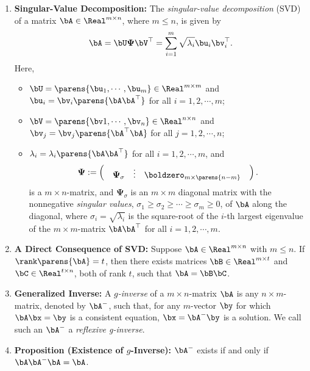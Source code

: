 \documentclass[12pt]{article}
\begin{document}
\begin{enumerate}[label=\textbf{\arabic*.}]
	\item \textbf{Singular-Value Decomposition:} The \textit{singular-value decomposition} (SVD) of a matrix $\bA \in \Real^{m \times n}$, where $m \le n$, is given by
	\begin{align}\label{eq-svd}
		\bA = \bU \boldsymbol{\Psi} \bV^{\top} = \sum_{i=1}^m \sqrt{\lambda_i} \bu_i \bv_i^\top. 
	\end{align}
	Here, 
	\begin{itemize}
		\item $\bU = \parens{\bu_1, \cdots, \bu_m} \in \Real^{m \times m}$ and $\bu_i = \bv_i \parens{\bA \bA^\top}$ for all $ i = 1, 2, \cdots, m$; 
		\item $\bV = \parens{\bv1, \cdots, \bv_n} \in \Real^{n \times n}$ and $\bv_j = \bv_j \parens{\bA^\top \bA}$ for all $j = 1, 2, \cdots, n$; 
		\item $\lambda_i = \lambda_i \parens{\bA \bA^\top}$ for all $i = 1, 2, \cdots, m$, and 
		\begin{align*}
			\boldsymbol{\Psi} := 
			\begin{pmatrix}
				\quad \boldsymbol{\Psi}_{\sigma} \quad \vdots \quad \boldzero_{m \times \parens{n-m} \quad}
			\end{pmatrix}. 
		\end{align*}
		is a $m \times n$-matrix, and $\boldsymbol{\Psi}_{\sigma}$ is an $m \times m$ diagonal matrix with the nonnegative \emph{singular values}, $ \sigma_1 \ge \sigma_2 \ge \cdots \ge \sigma_m \ge 0 $, of $\bA$ along the diagonal, where $\sigma_i = \sqrt{\lambda_i}$ is the square-root of the $i$-th largest eigenvalue of the $m \times m$-matrix $\bA \bA^\top$ for all $i = 1, 2, \cdots, m$. 
	\end{itemize}
	
	\item \textbf{A Direct Consequence of SVD:} Suppose $\bA \in \Real^{m \times n}$ with $m \le n$. If $\rank \parens{\bA} = t$, then there exists matrices $\bB \in \Real^{m \times t}$ and $\bC \in \Real^{t \times n}$, both of rank $t$, such that $\bA = \bB \bC$. 
	
	\item \textbf{Generalized Inverse:} A \emph{$g$-inverse} of a $m \times n$-matrix $\bA$ is any $n \times m$-matrix, denoted by $\bA^-$, such that, for any $m$-vector $\by$ for which $\bA \bx = \by$ is a consistent equation, $ \bx = \bA^- \by$ is a solution. We call such an $\bA^-$ a \textit{reflexive g-inverse}. 
	
	\item \textbf{Proposition (Existence of $g$-Inverse):} $\bA^-$ exists if and only if $\bA \bA^- \bA = \bA$. 
	

\end{enumerate}
\end{document}
